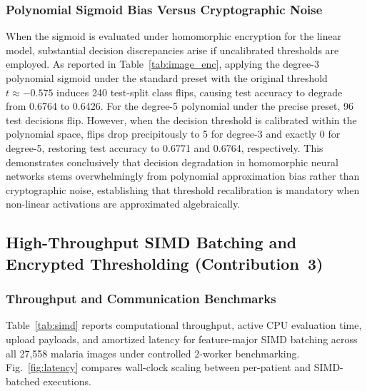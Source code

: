 \documentclass[conference]{IEEEtran}
\begin{document}
\subsubsection{Polynomial Sigmoid Bias Versus Cryptographic Noise}
When the sigmoid is evaluated under homomorphic encryption for the linear model, substantial decision discrepancies arise if uncalibrated thresholds are employed. As reported in Table~\ref{tab:image_enc}, applying the degree-3 polynomial sigmoid under the standard preset with the original threshold $t \approx -0.575$ induces 240 test-split class flips, causing test accuracy to degrade from 0.6764 to 0.6426. For the degree-5 polynomial under the precise preset, 96 test decisions flip. However, when the decision threshold is calibrated within the polynomial space, flips drop precipitously to 5 for degree-3 and exactly 0 for degree-5, restoring test accuracy to 0.6771 and 0.6764, respectively. This demonstrates conclusively that decision degradation in homomorphic neural networks stems overwhelmingly from polynomial approximation bias rather than cryptographic noise, establishing that threshold recalibration is mandatory when non-linear activations are approximated algebraically.

\subsection{High-Throughput SIMD Batching and Encrypted Thresholding (Contribution~3)}

\subsubsection{Throughput and Communication Benchmarks}
Table~\ref{tab:simd} reports computational throughput, active CPU evaluation time, upload payloads, and amortized latency for feature-major SIMD batching across all 27,558 malaria images under controlled 2-worker benchmarking. Fig.~\ref{fig:latency} compares wall-clock scaling between per-patient and SIMD-batched executions.
\end{document}
